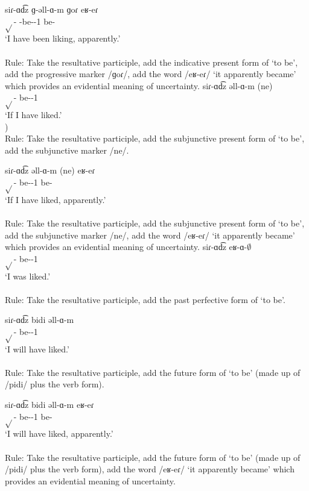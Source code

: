 \begin{exe}
\begin{xlist}
		\ex \gll 
		siɾ-ɑd͡z ɡ-əll-ɑ-m ɡoɾ eʁ-eɾ \\
		$\sqrt{}$-{\rptcp} {\ind}-be-{\thgloss}-1{\sg} {\prog} be-{\eptcp} \\
		\trans `I have been liking, apparently.' \\
		 \\
		Rule: Take the resultative participle, add the indicative present form of `to be', add the progressive marker /ɡoɾ/, add the word /eʁ-eɾ/ `it apparently became' which provides an evidential meaning of uncertainty.
		\ex \gll siɾ-ɑd͡z əll-ɑ-m (ne) \\
		$\sqrt{}$-{\rptcp} be-{\thgloss}-1{\sg} {\sbjv} \\
		\trans `If I have liked.' \\
		) \\
		Rule: Take the resultative participle, add the subjunctive present form of `to be', add the subjunctive marker /ne/.
		
		\ex \gll siɾ-ɑd͡z əll-ɑ-m (ne) eʁ-eɾ \\
		$\sqrt{}$-{\rptcp} be-{\thgloss}-1{\sg} {\sbjv} be-{\eptcp} \\
		\trans `If I have liked, apparently.' \\
		 \\
		Rule: Take the resultative participle, add the subjunctive present form of `to be', add the subjunctive marker /ne/, add the word /eʁ-eɾ/ `it apparently became' which provides an evidential meaning of uncertainty.
		\ex \gll siɾ-ɑd͡z eʁ-ɑ-$\emptyset$ \\
		$\sqrt{}$-{\rptcp} be-{\pst}-1{\sg}\\
		\trans `I was liked.' \\
		 \\
		Rule: Take the resultative participle, add the past perfective form of `to be'. 
		
		\ex \gll siɾ-ɑd͡z bidi əll-ɑ-m \\
		$\sqrt{}$-{\rptcp} {\fut} be-{\thgloss}-1{\sg} \\
		\trans `I will have liked.' \\
		 \\
		Rule: Take the resultative participle, add the future form of `to be' (made up of /pidi/ plus the verb form). 
		
		\ex \gll siɾ-ɑd͡z bidi əll-ɑ-m eʁ-eɾ \\
		$\sqrt{}$-{\rptcp} {\fut} be-{\thgloss}-1{\sg} be-{\eptcp}\\
		\trans `I will have liked, apparently.' \\
		 \\
		Rule: Take the resultative participle, add the future form of `to be' (made up of /pidi/ plus the verb form), add the word /eʁ-eɾ/ `it apparently became' which provides an evidential meaning of uncertainty. 
		

\end{xlist}
\end{exe}
